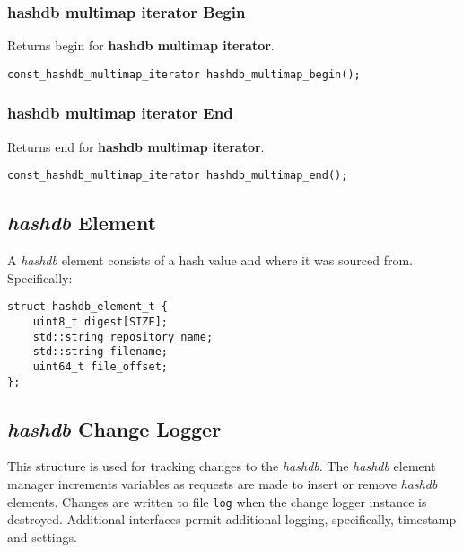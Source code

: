 \documentclass[12pt,twoside]{article}
\newcommand{\hdb}{\emph{hashdb}\xspace}
\newcommand{\hmmi}{\textbf{hashdb multimap iterator}\xspace}
\begin{document}
\subsubsection{\hmmi Begin}
Returns begin for \hmmi.

\begin{small}
\begin{verbatim}
const_hashdb_multimap_iterator hashdb_multimap_begin();
\end{verbatim}
\end{small}

\subsubsection{\hmmi End}
Returns end for \hmmi.

\begin{small}
\begin{verbatim}
const_hashdb_multimap_iterator hashdb_multimap_end();
\end{verbatim}
\end{small}

\subsection{\hdb Element}
A \hdb element consists of a hash value and where it was sourced from.
Specifically:
\begin{small}
\begin{verbatim}
struct hashdb_element_t {
    uint8_t digest[SIZE];
    std::string repository_name;
    std::string filename;
    uint64_t file_offset;
};
\end{verbatim}
\end{small}

\subsection{\hdb Change Logger}
This structure is used for tracking changes to the \hdb.
The \hdb element manager increments variables
as requests are made to insert or remove \hdb elements.
Changes are written to file \texttt{log}
when the change logger instance is destroyed.
Additional interfaces permit additional logging,
specifically, timestamp and settings.
\end{document}
